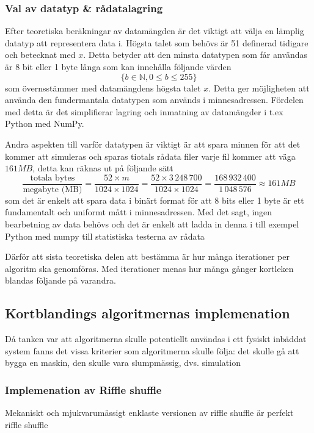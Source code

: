 \documentclass[swedish,a4paper]{article}
\begin{document}
\subsubsection{Val av datatyp \& rådatalagring} 
Efter teoretiska beräkningar av
datamängden är det viktigt att välja en lämplig datatyp att representera data i.
Högsta talet som behövs är 51 definerad tidigare och betecknat med $x$. Detta
betyder att den minsta datatypen som får användas är 8 bit eller 1 byte långa som
kan  innehålla följande värden $$\{b \in \mathbb{N},  0 \leq b \leq 255 \}$$ som
överns\-stämmer med datamängdens högsta talet $x$. Detta ger möjligheten att
använda den  fundermantala datatypen som används i minnesadressen. Fördelen med
detta är det simplifierar lagring och inmatning av datamängder i t.ex Python
med NumPy.

Andra aspekten till varför datatypen är viktigt är att spara minnen för att det
kommer att simuleras och sparas tiotals rådata filer varje fil kommer att väga
$161 MB$,
detta kan räknas ut på följande sätt
$$ \frac{\text{totala bytes}}{\text{megabyte (MB)}} = \frac{52 \times m }{1024 \times
1024} = \frac{52 \times 3\,248\,700}{1024 \times 1024} = \frac{168\,932\,400}{1\,048\,576} \approx 161 MB 
$$
som det är enkelt att spara data i binärt format för att 8 bits eller 1 byte
är ett fundamentalt och uniformt mått i minnesadressen. Med det sagt, ingen
bearbetning av data behövs och det är enkelt att ladda in denna i till exempel Python
med numpy till statistiska testerna av rådata

Därför att sista teoretiska delen att bestämma
är hur många iterationer per algoritm ska genomföras. Med iterationer menas
hur många gånger kortleken blandas följande på varandra.

\subsection{Kortblandings algoritmernas implemenation}

Då tanken var att  algoritmerna skulle potentiellt användas i ett fysiskt
inbäddat system fanns det vissa  kriterier som algoritmerna skulle följa: det
skulle gå att bygga en maskin, den skulle vara slumpmässig, dvs. simulation

\subsubsection{Implemenation av Riffle shuffle}
Mekaniskt och mjukvarumässigt enklaste versionen av riffle shuffle är perfekt riffle shuffle
\end{document}
